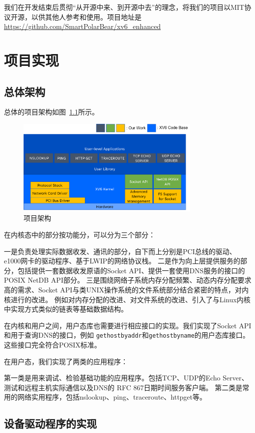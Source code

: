 \documentclass[a4paper,twoside]{ctexrep}
\begin{document}
\begin{spacing}{1.2}
我们在开发结束后贯彻“从开源中来、到开源中去”的理念，将我们的项目以MIT协议开源，以供其他人参考和使用。项目地址是\url{https://github.com/SmartPolarBear/xv6_enhanced}

\chapter{项目实现}

\section{总体架构}
总体的项目架构如图~\ref{fig:arch}所示。
\begin{figure}[htb]
	\centering
	\includegraphics[width=0.8\textwidth]{arch.png}
	\caption{项目架构}
	\label{fig:arch}
\end{figure}

在内核态中的部分按功能分，可以分为三个部分：

一是负责处理实际数据收发、通讯的部分，自下而上分别是PCI总线的驱动、e1000网卡的驱动程序、基于LWIP的网络协议栈。
二是作为向上层提供服务的部分，包括提供一套数据收发原语的Socket API、提供一套使用DNS服务的接口的POSIX NetDB API部分。
三是围绕网络子系统内存分配频繁、动态内存分配要求高的需求、Socket API与类UNIX操作系统的文件系统部分结合紧密的特点，对内核进行的改进。
例如对内存分配的改进、对文件系统的改进、引入了与Linux内核中实现方式类似的链表等基础数据结构。

在内核和用户之间，用户态库也需要进行相应接口的实现。我们实现了Socket API和用于查询DNS的接口，例如
\texttt{gethostbyaddr}和\texttt{gethostbyname}的用户态库接口。
这些接口完全符合POSIX标准。

在用户态，我们实现了两类的应用程序：

第一类是用来调试、检验基础功能的应用程序。包括TCP、UDP的Echo Server、测试和远程主机实际通信以及DNS的
RFC 867日期时间服务客户端。
第二类是常用的网络实用程序，包括nslookup、ping、traceroute、httpget等。

\section{设备驱动程序的实现}


\end{spacing}
\end{document}
